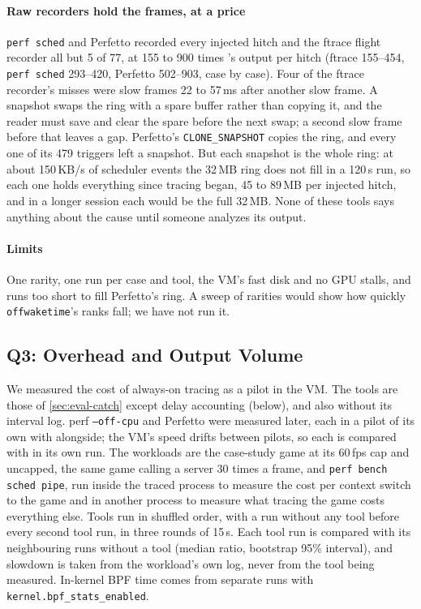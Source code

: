 \paragraph{Raw recorders hold the frames, at a price} \texttt{perf sched}
and Perfetto recorded every injected hitch and the ftrace flight recorder
all but 5 of 77, at 155 to 900 times \sys's output per hitch (ftrace
155--454, \texttt{perf sched} 293--420, Perfetto 502--903, case by case).
Four of the ftrace recorder's misses were slow frames 22 to 57\,ms after
another slow frame. A snapshot swaps the ring with a spare buffer rather
than copying it, and the reader must save and clear the spare before the
next swap; a second slow frame before that leaves a gap. Perfetto's
\texttt{CLONE\_SNAPSHOT} copies the ring, and every one of its 479 triggers
left a snapshot. But each snapshot is the whole ring: at about 150\,KB/s of
scheduler events the 32\,MB ring does not fill in a 120\,s run, so each one
holds everything since tracing began, 45 to 89\,MB per injected hitch, and
in a longer session each would be the full 32\,MB. None of these tools says
anything about the cause until someone analyzes its output.

\paragraph{Limits} One rarity, one run per case and tool, the VM's fast disk and
no GPU stalls, and runs too short to fill Perfetto's ring. A sweep of
rarities would show how quickly \texttt{offwaketime}'s ranks fall; we have not
run it.

\subsection{Q3: Overhead and Output Volume}
\label{sec:eval-overhead}

We measured the cost of always-on tracing as a pilot in the VM.
The tools are those of \autoref{sec:eval-catch} except delay accounting
(below), and \sys also without its interval log. perf \texttt{--off-cpu} and
Perfetto were measured later, each in a pilot of its own with \sys
alongside; the VM's speed drifts between pilots, so each is compared with
\sys in its own run. The workloads are the
case-study game at its 60\,fps cap and uncapped, the same game calling a
server 30 times a frame, and \texttt{perf bench sched pipe}, run inside the traced process
to measure the cost per context switch to the game and in another process
to measure what tracing the game costs everything else. Tools run in
shuffled order, with a run without any tool before every second tool run,
in three rounds of 15\,s. Each tool run is compared with its neighbouring
runs without a tool (median ratio, bootstrap 95\% interval), and slowdown
is taken from the workload's own log, never from the tool being measured.
In-kernel BPF time comes from separate runs with
\texttt{kernel.bpf\_stats\_enabled}.

